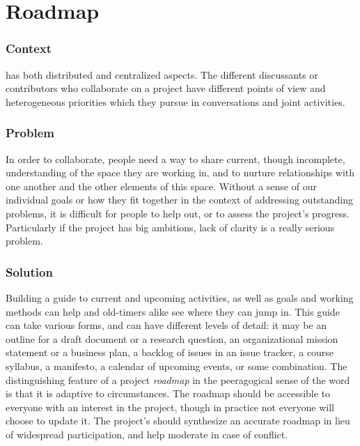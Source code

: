

\section{Roadmap} \label{sec:Roadmap}



\subsubsection*{Context}  has both distributed and centralized aspects. The different discussants or contributors who collaborate on a project have different points of view and heterogeneous priorities which they pursue in conversations and joint activities.

\subsubsection*{Problem} In order to collaborate, people need a way to share current, though incomplete, understanding of the space they are working in, and to nurture relationships with one another and the other elements of this space.  Without a sense of our individual goals or how they fit together in the context of addressing outstanding problems, it is difficult for people to help out, or to assess the 
project's progress.  Particularly if the project has big ambitions, lack of clarity is a really serious problem.

\subsubsection*{Solution} Building a guide to current and upcoming activities, as well as goals and working methods can help  and old-timers alike see where they can jump in.  This guide can take various forms, and can have different levels of detail: it may be an outline for a draft document or a research question, an organizational mission statement or a business plan, a backlog of issues in an issue tracker, a course syllabus, a manifesto, a calendar of upcoming events, or some combination.  The distinguishing feature of a project \emph{roadmap} in the peeragogical sense of the word is that it is adaptive to circumstances.  The roadmap should be accessible to everyone with an interest in the project, though in practice not everyone will choose to update it.  The project's  should synthesize an accurate roadmap in lieu of widespread participation, and help moderate in case of conflict.

